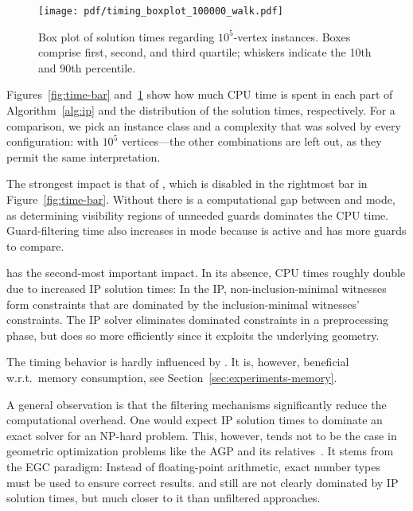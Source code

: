 \begin{figure}
	\centering
	\texttt{[image: pdf/timing\_boxplot\_100000\_walk.pdf]}
	\caption{Box plot of solution times regarding $10^5$-vertex \walk instances.
		Boxes comprise first, second, and third quartile;
		whiskers indicate the 10th and 90th percentile.}
	\label{fig:time-boxplot}
\end{figure}

Figures~\ref{fig:time-bar} and~\ref{fig:time-boxplot} show how much CPU time is spent in each part of Algorithm~\ref{alg:ip} and the distribution of the solution times, respectively.
For a comparison, we pick an instance class and a complexity that was solved by every configuration:
\walk with $10^5$ vertices\dash---the other combinations are left out, as they permit the same interpretation.

The strongest impact is that of \pointguardfilter, which is disabled in the rightmost bar in Figure~\ref{fig:time-bar}.
Without \pointguardfilter there is a computational gap between \pointguardmode and \vertexguardmode mode, as determining visibility regions of unneeded guards dominates the CPU time.
Guard-filtering time also increases in \pnoedge mode because \domfilter is active and has more guards to compare.

\witnessfilter has the second-most important impact.
In its absence, CPU times roughly double due to increased \ac{IP} solution times:
In the \ac{IP}, non-inclusion-minimal witnesses form constraints that are dominated by the inclusion-minimal witnesses' constraints.
The \ac{IP} solver eliminates dominated constraints in a preprocessing phase, but \witnessfilter does so more efficiently since it exploits the underlying geometry.

The timing behavior is hardly influenced by \domfilter.
It is, however, beneficial w.r.t.\ memory consumption, see Section~\ref{sec:experiments-memory}.

A general observation is that the filtering mechanisms significantly reduce the computational overhead.
One would expect \ac{IP} solution times to dominate an exact solver for an NP-hard problem.
This, however, tends not to be the case in geometric optimization problems like the \ac{AGP} and its relatives~\cite{rsfhkt-eag-14}.
It stems from the \ac{EGC} paradigm:
Instead of floating-point arithmetic, exact number types must be used to ensure correct results.
\vdefault and \pdefault still are not clearly dominated by \ac{IP} solution times, but much closer to it than unfiltered approaches.

